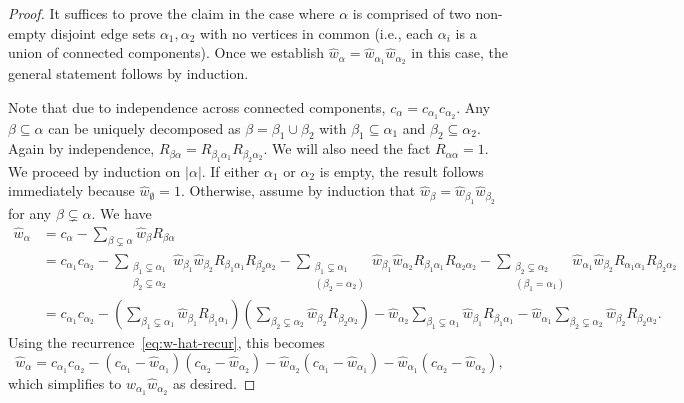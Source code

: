 \documentclass{article}
\begin{document}
\begin{proof}
It suffices to prove the claim in the case where $\alpha$ is comprised of two non-empty disjoint edge sets $\alpha_1, \alpha_2$ with no vertices in common (i.e., each $\alpha_i$ is a union of connected components). Once we establish $\hat w_\alpha = \hat w_{\alpha_1} \hat w_{\alpha_2}$ in this case, the general statement follows by induction.

Note that due to independence across connected components, $c_\alpha = c_{\alpha_1} c_{\alpha_2}$. Any $\beta \subseteq \alpha$ can be uniquely decomposed as $\beta = \beta_1 \cup \beta_2$ with $\beta_1 \subseteq \alpha_1$ and $\beta_2 \subseteq \alpha_2$. Again by independence, $R_{\beta\alpha} = R_{\beta_1 \alpha_1} R_{\beta_2 \alpha_2}$. We will also need the fact $R_{\alpha\alpha} = 1$. We proceed by induction on $|\alpha|$. If either $\alpha_1$ or $\alpha_2$ is empty, the result follows immediately because $\hat{w}_\emptyset = 1$. Otherwise, assume by induction that $\hat w_\beta = \hat w_{\beta_1} \hat w_{\beta_2}$ for any $\beta \subsetneq \alpha$. We have
\begin{align*}
\hat w_\alpha &= c_\alpha - \sum_{\beta \subsetneq \alpha} \hat w_\beta R_{\beta\alpha} \\
&= c_{\alpha_1} c_{\alpha_2} - \sum_{\substack{\beta_1 \subsetneq \alpha_1 \\ \beta_2 \subsetneq \alpha_2}} \hat w_{\beta_1} \hat w_{\beta_2} R_{\beta_1 \alpha_1} R_{\beta_2 \alpha_2} - \sum_{\substack{\beta_1 \subsetneq \alpha_1 \\ (\beta_2 = \alpha_2)}} \hat w_{\beta_1} \hat w_{\alpha_2} R_{\beta_1 \alpha_1} R_{\alpha_2 \alpha_2} - \sum_{\substack{\beta_2 \subsetneq \alpha_2 \\ (\beta_1 = \alpha_1)}} \hat w_{\alpha_1} \hat w_{\beta_2} R_{\alpha_1 \alpha_1} R_{\beta_2 \alpha_2} \\
&= c_{\alpha_1} c_{\alpha_2} - \left(\sum_{\beta_1 \subsetneq \alpha_1} \hat w_{\beta_1} R_{\beta_1 \alpha_1}\right)\left(\sum_{\beta_2 \subsetneq \alpha_2} \hat w_{\beta_2} R_{\beta_2 \alpha_2}\right) - \hat w_{\alpha_2} \sum_{\beta_1 \subsetneq \alpha_1} \hat w_{\beta_1} R_{\beta_1 \alpha_1} - \hat w_{\alpha_1} \sum_{\beta_2 \subsetneq \alpha_2} \hat w_{\beta_2} R_{\beta_2 \alpha_2}.
\end{align*}
Using the recurrence~\eqref{eq:w-hat-recur}, this becomes
\[ \hat{w}_\alpha = c_{\alpha_1} c_{\alpha_2} - (c_{\alpha_1} - \hat{w}_{\alpha_1})(c_{\alpha_2} - \hat{w}_{\alpha_2}) - \hat w_{\alpha_2} (c_{\alpha_1} - \hat{w}_{\alpha_1}) - \hat w_{\alpha_1} (c_{\alpha_2} - \hat{w}_{\alpha_2}), \]
which simplifies to $\hat{w}_{\alpha_1} \hat{w}_{\alpha_2}$ as desired.
\end{proof}
\end{document}
